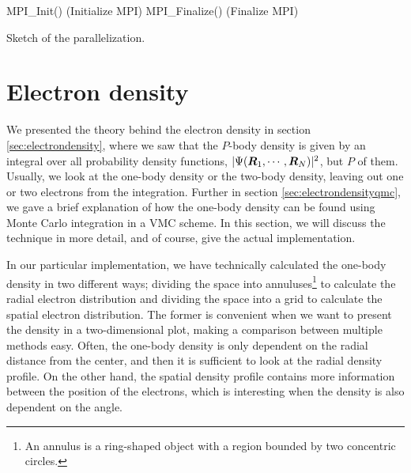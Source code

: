 \IncMargin{1em}
\begin{algorithm}
	\SetAlgoLined
	MPI\_Init() (Initialize MPI)\;
	MPI\_Finalize() (Finalize MPI)\;
	\caption{Sketch of the parallelization.}
	\label{alg:mpi}
\end{algorithm}\DecMargin{1em}

\section{Electron density} \label{sec:electrondensityimplementation}
We presented the theory behind the electron density in section \ref{sec:electrondensity}, where we saw that the $P$-body density is given by an integral over all probability density functions, $|\Psi(\boldsymbol{{R}}_1,\cdots,\boldsymbol{{R}}_N)|^2$, but $P$ of them. Usually, we look at the one-body density or the two-body density, leaving out one or two electrons from the integration. Further in section \ref{sec:electrondensityqmc}, we gave a brief explanation of how the one-body density can be found using Monte Carlo integration in a VMC scheme. In this section, we will discuss the technique in more detail, and of course, give the actual implementation.

In our particular implementation, we have technically calculated the one-body density in two different ways; dividing the space into annuluses\footnote{An annulus is a ring-shaped object with a region bounded by two concentric circles.} to calculate the radial electron distribution and dividing the space into a grid to calculate the spatial electron distribution. The former is convenient when we want to present the density in a two-dimensional plot, making a comparison between multiple methods easy. Often, the one-body density is only dependent on the radial distance from the center, and then it is sufficient to look at the radial density profile. On the other hand, the spatial density profile contains more information between the position of the electrons, which is interesting when the density is also dependent on the angle.

